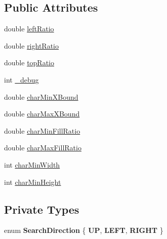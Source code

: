 \subsection*{Public Attributes}
\begin{DoxyCompactItemize}
\item 
double \hyperlink{classfilter_1_1algos_1_1_i_d_plate_rectifier_a9b8cc183136dd1579a1bebdb72690bc3}{left\+Ratio}
\item 
double \hyperlink{classfilter_1_1algos_1_1_i_d_plate_rectifier_abd15814b354c2c540a0f7dd59d68e7fb}{right\+Ratio}
\item 
double \hyperlink{classfilter_1_1algos_1_1_i_d_plate_rectifier_a47af5ce4c82941acdaf2b8e0df0d85d5}{top\+Ratio}
\item 
int \hyperlink{classfilter_1_1algos_1_1_i_d_plate_rectifier_a8572bfa44fbd8e1aa65b61f94304fd95}{\+\_\+debug}
\item 
double \hyperlink{classfilter_1_1algos_1_1_i_d_plate_rectifier_a3c83d66fb53bbd47cc6259b2d50880e9}{char\+Min\+X\+Bound}
\item 
double \hyperlink{classfilter_1_1algos_1_1_i_d_plate_rectifier_ab9fb0880fe39383c0a23241f50ae3130}{char\+Max\+X\+Bound}
\item 
double \hyperlink{classfilter_1_1algos_1_1_i_d_plate_rectifier_ab3d1568bbd49a16ca89432ccff63d331}{char\+Min\+Fill\+Ratio}
\item 
double \hyperlink{classfilter_1_1algos_1_1_i_d_plate_rectifier_ac4f81a5a0aea81b71470d2d56cd1b363}{char\+Max\+Fill\+Ratio}
\item 
int \hyperlink{classfilter_1_1algos_1_1_i_d_plate_rectifier_a68f101f60d303239cc8959e5c050d511}{char\+Min\+Width}
\item 
int \hyperlink{classfilter_1_1algos_1_1_i_d_plate_rectifier_a16951729a23ca52f98351102fa0b334e}{char\+Min\+Height}
\end{DoxyCompactItemize}
\subsection*{Private Types}
\begin{DoxyCompactItemize}
\item 
\mbox{\label{classfilter_1_1algos_1_1_i_d_plate_rectifier_abbacdb5946b362f8353cd3c0c57be315}} 
enum {\bfseries Search\+Direction} \{ {\bfseries UP}, 
{\bfseries L\+E\+FT}, 
{\bfseries R\+I\+G\+HT}
 \}
\end{DoxyCompactItemize}
